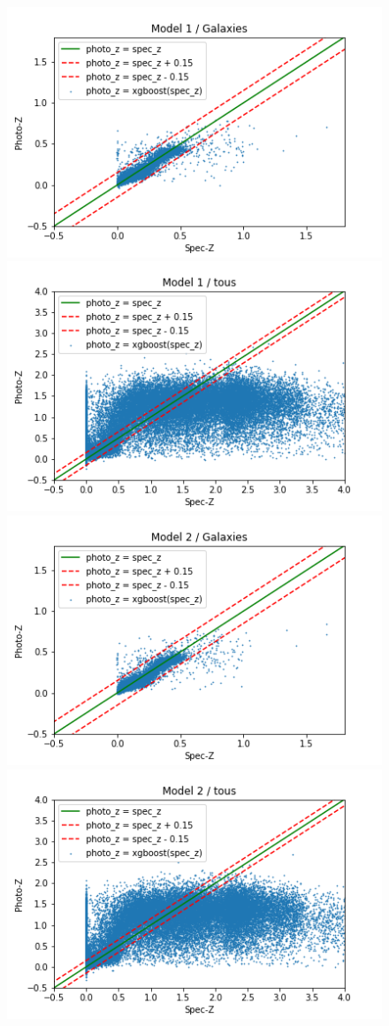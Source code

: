 \begin{figure}[H]
	\includegraphics[scale = 0.4]{images/model1_galaxies.png}
	\includegraphics[scale = 0.4]{images/model1_tous.png}
	\includegraphics[scale = 0.4]{images/model2_galaxies.png}
	\includegraphics[scale = 0.4]{images/model2_tous.png}

\end{figure}
